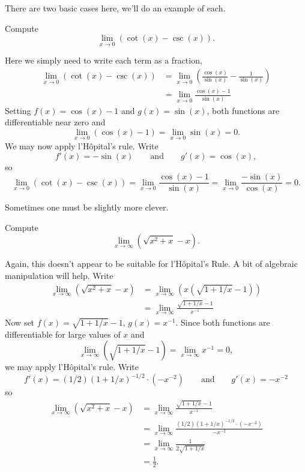 \documentclass{ximera}
\begin{document}
There are two basic cases here, we'll do an example of each.

\begin{example}[$\pmb\infty$--$\pmb\infty$]
Compute
\[
\lim_{x\to 0} \left(\cot(x) - \csc(x)\right).
\]

Here we simply need to write each term as a fraction,
\begin{align*}
\lim_{x\to 0} \left(\cot(x) - \csc(x)\right) &= \lim_{x\to 0} \left(\frac{\cos(x)}{\sin(x)} - \frac{1}{\sin(x)}\right)\\
&= \lim_{x\to 0} \frac{\cos(x)-1}{\sin(x)} 
\end{align*}
Setting $f(x) = \cos(x)-1$ and $g(x)=\sin(x)$, both functions are differentiable near zero and 
\[
\lim_{x\to 0}(\cos(x)-1)=\lim_{x\to 0}\sin(x) = 0.
\]
We may now apply l'H\^opital's rule. Write
\[
f'(x) = -\sin(x)\qquad \text{and}\qquad g'(x) = \cos(x),
\]
so
\[
\lim_{x\to 0} \left(\cot(x) - \csc(x)\right) = \lim_{x\to 0} \frac{\cos(x)-1}{\sin(x)} = \lim_{x\to 0} \frac{-\sin(x)}{\cos(x)} =0.
\]
\end{example}


Sometimes one must be slightly more clever. 

\begin{example}[$\pmb\infty$--$\pmb\infty$]
Compute
\[
\lim_{x\to\infty}\left(\sqrt{x^2+x}-x\right).
\]

Again, this doesn't appear to be suitable for l'H\^opital's Rule. A bit of algebraic manipulation will help. Write
\begin{align*}
\lim_{x\to\infty}\left(\sqrt{x^2+x}-x\right) &= \lim_{x\to\infty}\left(x\left(\sqrt{1+1/x}-1\right)\right)\\
&=\lim_{x\to\infty}\frac{\sqrt{1+1/x}-1}{x^{-1}}
\end{align*}
Now set $f(x) = \sqrt{1+1/x}-1$, $g(x) = x^{-1}$. Since both
  functions are differentiable for large values of $x$ and 
\[
\lim_{x\to\infty} (\sqrt{1+1/x}-1) = \lim_{x\to\infty}x^{-1} = 0, 
\]
we may apply l'H\^opital's rule. Write
\[
f'(x) = (1/2)(1+1/x)^{-1/2}\cdot(-x^{-2}) \qquad \text{and}\qquad g'(x) = -x^{-2}
\]
so
\begin{align*}
\lim_{x\to\infty}\left(\sqrt{x^2+x}-x\right) &= \lim_{x\to\infty}\frac{\sqrt{1+1/x}-1}{x^{-1}} \\
&= \lim_{x\to\infty}\frac{(1/2)(1+1/x)^{-1/2}\cdot(-x^{-2})}{-x^{-2}} \\
&= \lim_{x\to\infty} \frac{1}{2\sqrt{1+1/x}}\\
&= \frac{1}{2}.
\end{align*}
\end{example}
\end{document}
